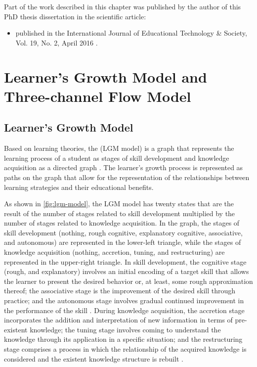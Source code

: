 Part of the work described in this chapter was published by the author of this PhD thesis dissertation in the scientific article:

\begin{itemize}
\item
{} published in the International Journal of Educational Technology \& Society, Vol. 19, No. 2, April 2016 \cite{ChallcoAndradeBorgesBittencourtIsotani2016}.
\end{itemize}


\section{Learner’s Growth Model and Three-channel Flow Model}
\label{sec:lgm-model-three-channel-flow-model}

\subsection{Learner’s Growth Model}
\label{subsec:learners-growth-model}

Based on learning theories, the  (LGM model) is a graph that represents the learning process of a student as stages of skill development and knowledge acquisition as a directed graph \cite{InabaIkedaMizoguchi2003, IsotaniMizoguchi2006}. The learner’s growth process is represented as paths on the graph that allow for the representation of the relationships between learning strategies and their educational benefits.

As shown in \autoref{fig:lgm-model}, the LGM model has twenty states that are the result of the number of stages related to skill development multiplied by the number of stages related to knowledge acquisition. In the graph, the stages of skill development (nothing, rough cognitive, explanatory cognitive, associative, and autonomous) are represented in the lower-left triangle, while the stages of knowledge acquisition (nothing, accretion, tuning, and restructuring) are represented in the upper-right triangle. In skill development, the cognitive stage (rough, and explanatory) involves an initial encoding of a target skill that allows the learner to present the desired behavior or, at least, some rough approximation thereof; the associative stage is the improvement of the desired skill through practice; and the autonomous stage involves gradual continued improvement in the performance of the skill \cite{Anderson1982}. During knowledge acquisition, the accretion stage incorporates the addition and interpretation of new information in terms of pre-existent knowledge; the tuning stage involves coming to understand the knowledge through its application in a specific situation; and the restructuring stage comprises a process in which the relationship of the acquired knowledge is considered and the existent knowledge structure is rebuilt \cite{RumelhartNorman1976}.


